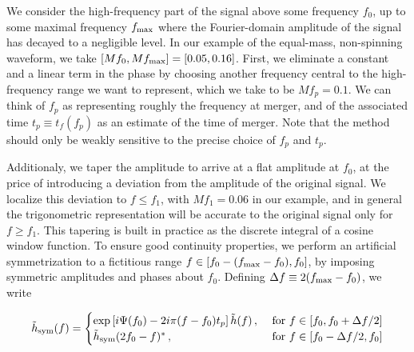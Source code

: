 \documentclass[aps,showpacs,twocolumn,
prd,superscriptaddress,nofootinbib]{revtex4-1}
\newcommand{\be}{\begin{equation}}
\newcommand{\ee}{\end{equation}}
\newcommand{\tf}{t_{f}}
\begin{document}
We consider the high-frequency part of the signal above some frequency $f_{0}$, up to some maximal frequency $f_{\rm max}$ where the Fourier-domain amplitude of the signal has decayed to a negligible level. In our example of the equal-mass, non-spinning waveform, we take $[Mf_{0}, Mf_{\rm max}] = [0.05, 0.16]$. First, we eliminate a constant and a linear term in the phase by choosing another frequency central to the high-frequency range we want to represent, which we take to be $Mf_{p} = 0.1$. We can think of $f_{p}$ as representing roughly the frequency at merger, and of the associated time $t_{p}\equiv \tf(f_{p})$ as an estimate of the time of merger. Note that the method should only be weakly sensitive to the precise choice of $f_{p}$ and $t_{p}$.

Additionaly, we taper the amplitude to arrive at a flat amplitude at $f_{0}$, at the price of introducing a deviation from the amplitude of the original signal. We localize this deviation to $f\leq f_{1}$, with $Mf_{1} = 0.06$ in our example, and in general the trigonometric representation will be accurate to the original signal only for $f\geq f_{1}$. This tapering is built in practice as the discrete integral of a cosine window function. To ensure good continuity properties, we perform an artificial symmetrization to a fictitious range $f\in [f_{0} - (f_{\rm max} - f_{0}), f_{0}]$, by imposing symmetric amplitudes and phases about $f_{0}$. Defining $\Delta f \equiv 2 (f_{\rm max} - f_{0})$, we write
\begin{widetext}
\be\label{eq:defhsym}
	\tilde{h}_{\rm sym}(f) = 
	\begin{cases} 
		\exp\left[i \Psi(f_{0}) - 2i\pi (f-f_{0}) t_{p} \right] \tilde{h}(f) \,,  &\text{ for } f \in [f_{0}, f_{0} + \Delta f /2] \\
	\tilde{h}_{\rm sym}(2 f_{0} - f)^{*} \,,  &\text{ for } f \in [f_{0} - \Delta f/2, f_{0}]
	\end{cases}
\ee
\end{widetext}
\end{document}
